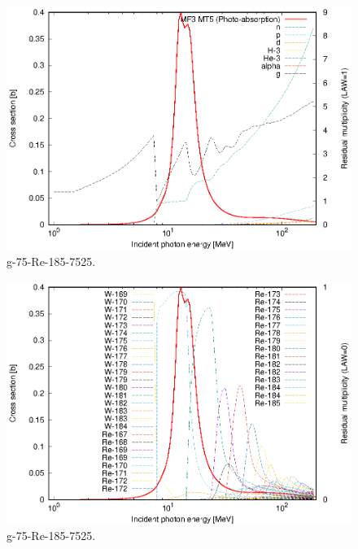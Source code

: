 \begin{figure}
 \includegraphics[width=\linewidth]{eps/g_75-Re-185_7525.eps}
  \caption{g-75-Re-185-7525.}
\end{figure}
\begin{figure}
 \includegraphics[width=\linewidth]{eps-law0/g_75-Re-185_7525.eps}
 \caption{g-75-Re-185-7525.}
\end{figure}
\newpage \clearpage

